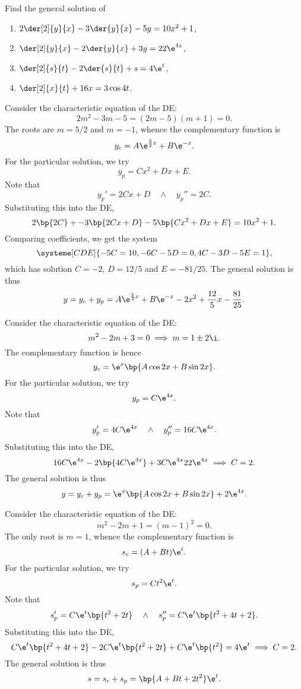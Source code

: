 \begin{problem}
    Find the general solution of
    \begin{enumerate}
        \item $2\der[2]{y}{x} - 3\der{y}{x} - 5y = 10x^2 + 1$,
        \item $\der[2]{y}{x} - 2\der{y}{x} + 3y = 22\e^{4x}$,
        \item $\der[2]{s}{t} - 2\der{s}{t} + s = 4\e^t$,
        \item $\der[2]{x}{t} + 16x = 3\cos 4t$.
    \end{enumerate}
\end{problem}
\begin{solution}
    \begin{ppart}
        Consider the characteristic equation of the DE: \[2m^2 - 3m - 5 = (2m-5)(m+1) = 0.\] The roots are $m = 5/2$ and $m = -1$, whence the complementary function is \[y_c = A \e^{\frac52x} + B \e^{-x}.\] For the particular solution, we try \[y_p = Cx^2 + Dx + E.\] Note that \[y_p' = 2Cx + D \quad \land \quad y_p'' = 2C.\] Substituting this into the DE, \[2\bp{2C} + -3\bp{2Cx + D} - 5\bp{Cx^2 + Dx + E} = 10x^2 + 1.\] Comparing coefficients, we get the system \[\systeme[CDE]{-5C = 10,-6C-5D = 0,4C-3D-5E=1},\] which has solution $C = -2$, $D = 12/5$ and $E = -81/25$. The general solution is thus \[y = y_c + y_p = A \e^{\frac52x} + B \e^{-x} - 2x^2 + \frac{12}5 x - \frac{81}{25}.\]
    \end{ppart}
    \begin{ppart}
        Consider the characteristic equation of the DE: \[m^2 - 2m + 3 = 0 \implies m = 1 \pm 2 \i.\] The complementary function is hence \[y_c = \e^x \bp{A\cos 2x + B\sin 2x}.\] For the particular solution, we try \[y_p = C\e^{4x}.\] Note that \[y_p' = 4C\e^{4x} \quad \land \quad y_p'' = 16C\e^{4x}.\] Substituting this into the DE, \[16C\e^{4x} - 2\bp{4C\e^{4x}} + 3C\e^{4x}  22\e^{4x} \implies C = 2.\] The general solution is thus \[y = y_c + y_p = \e^x \bp{A \cos 2x + B \sin 2x} + 2\e^{4x}.\]
    \end{ppart}
    \begin{ppart}
        Consider the characteristic equation of the DE: \[m^2 - 2m + 1 = (m-1)^2 = 0.\] The only root is $m = 1$, whence the complementary function is \[s_c = (A + Bt) \e^{t}.\] For the particular solution, we try \[s_p = Ct^2 \e^t.\] Note that \[s_p' = C\e^t\bp{t^2 + 2t} \quad \land \quad s_p'' = C\e^t \bp{t^2 + 4t + 2}.\] Substituting this into the DE, \[C\e^t \bp{t^2 + 4t + 2} - 2C\e^t \bp{t^2 + 2t} + C\e^t \bp{t^2} = 4\e^t \implies C = 2.\] The general solution is thus \[s = s_c + s_p = \bp{A + Bt + 2t^2} \e^{t}.\]

\end{ppart}
\end{solution}

